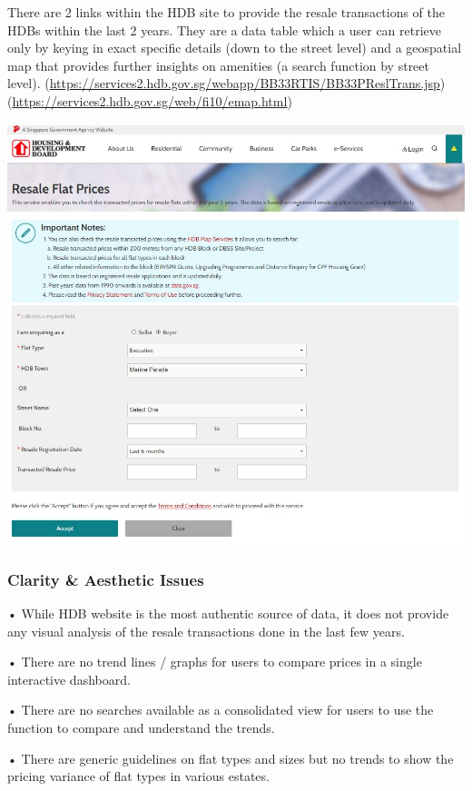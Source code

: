 \documentclass{acm_proc_article-sp}
\begin{document}
There are 2 links within the HDB site to provide the resale transactions
of the HDBs within the last 2 years. They are a data table which a user
can retrieve only by keying in exact specific details (down to the
street level) and a geospatial map that provides further insights on
amenities (a search function by street level).
(\url{https://services2.hdb.gov.sg/webapp/BB33RTIS/BB33PReslTrans.jsp})
(\url{https://services2.hdb.gov.sg/web/fi10/emap.html})

\includegraphics{IMG/img2.jpg}

\hypertarget{clarity-aesthetic-issues}{%
\subsubsection{Clarity \& Aesthetic
Issues}\label{clarity-aesthetic-issues}}

• While HDB website is the most authentic source of data, it does not
provide any visual analysis of the resale transactions done in the last
few years.

• There are no trend lines / graphs for users to compare prices in a
single interactive dashboard.

• There are no searches available as a consolidated view for users to
use the function to compare and understand the trends.

• There are generic guidelines on flat types and sizes but no trends to
show the pricing variance of flat types in various estates.
\end{document}
